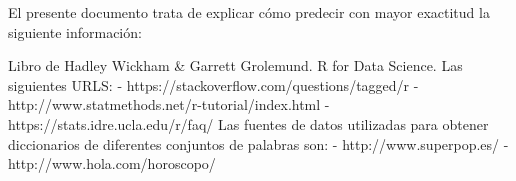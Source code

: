 \documentclass[11pt,a4paper]{article}
\begin{document}
\begin{thebibliography}{}

El presente documento trata de explicar c\'omo predecir con mayor exactitud la siguiente informaci\'on:\newline\newline

Libro de Hadley Wickham & Garrett Grolemund. R for Data Science.\newline\newline
Las siguientes URLS:\newline
-	https://stackoverflow.com/questions/tagged/r \newline
-	http://www.statmethods.net/r-tutorial/index.html\newline
-	https://stats.idre.ucla.edu/r/faq/\newline\newline
Las fuentes de datos utilizadas para obtener diccionarios de diferentes conjuntos de palabras son:\newline
-	http://www.superpop.es/\newline
-	http://www.hola.com/horoscopo/\newline


\end{thebibliography}
\end{document}
